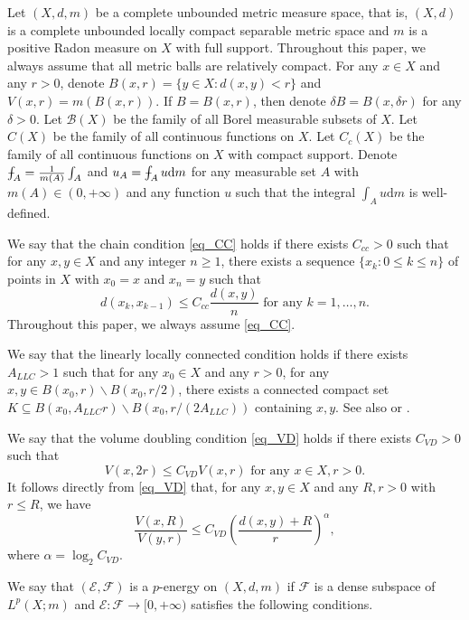 \documentclass[10pt,a4paper]{amsart}
\numberwithin{equation}{section}
\def\Xint#1{\mathchoice
{\XXint\displaystyle\textstyle{#1}}%
{\XXint\textstyle\scriptstyle{#1}}%
{\XXint\scriptstyle\scriptscriptstyle{#1}}%
{\XXint\scriptscriptstyle\scriptscriptstyle{#1}}%
\!\int}
\def\XXint#1#2#3{{\setbox0=\hbox{$#1{#2#3}{\int}$ }
\vcenter{\hbox{$#2#3$ }}\kern-.6\wd0}}
\def\dashint{\Xint-}
\begin{document}
Let $(X,d,m)$ be a complete unbounded metric measure space, that is, $(X,d)$ is a complete unbounded locally compact separable metric space and $m$ is a positive Radon measure on $X$ with full support. Throughout this paper, we always assume that all metric balls are relatively compact. For any $x\in X$ and any $r>0$, denote $B(x,r)=\{y\in X:d(x,y)<r\}$ and $V(x,r)=m(B(x,r))$. If $B=B(x,r)$, then denote $\delta B=B(x,\delta r)$ for any $\delta>0$. Let $\mathcal{B}(X)$ be the family of all Borel measurable subsets of $X$. Let $C(X)$ be the family of all continuous functions on $X$. Let $C_c(X)$ be the family of all continuous functions on $X$ with compact support. Denote $\dashint_A=\frac{1}{m(A)}\int_A$ and $u_A=\dashint_Au\mathrm{d} m$ for any measurable set $A$ with $m(A)\in(0,+\infty)$ and any function $u$ such that the integral $\int_Au\mathrm{d} m$ is well-defined.

We say that the chain condition \ref{eq_CC} holds if there exists $C_{cc}>0$ such that for any $x,y\in X$ and any integer $n\ge1$, there exists a sequence $\{x_k:0\le k\le n\}$ of points in $X$ with $x_0=x$ and $x_n=y$ such that
\begin{equation*}\label{eq_CC}\tag*{CC}
d(x_k,x_{k-1})\le C_{cc} \frac{d(x,y)}{n}\text{ for any }k=1,\ldots,n.
\end{equation*}
Throughout this paper, we always assume \ref{eq_CC}.

We say that the linearly locally connected condition \hypertarget{eq_LLC}{} holds if there exists $A_{LLC}>1$ such that for any $x_0\in X$ and any $r>0$, for any $x,y\in B(x_0,r)\backslash B(x_0,r/2)$, there exists a connected compact set $K\subseteq B(x_0,A_{LLC}r)\backslash B(x_0,r/(2A_{LLC}))$ containing $x,y$. See also \cite[3.12]{HK98} or \cite[Page 234]{HKST15}.

We say that the volume doubling condition \ref{eq_VD} holds if there exists $C_{VD}>0$ such that
\begin{equation*}\label{eq_VD}\tag*{VD}
V(x,2r)\le C_{VD}V(x,r)\text{ for any }x\in X,r>0.
\end{equation*}
It follows directly from \ref{eq_VD} that, for any $x,y\in X$ and any $R,r>0$ with $r\le R$, we have
\begin{equation}\label{eq_VDa}
\frac{V(x,R)}{V(y,r)}\le C_{VD} \left(\frac{d(x,y)+R}{r}\right)^{\alpha},
\end{equation}
where $\alpha=\log_2C_{VD}$.

We say that $(\mathcal{E},\mathcal{F})$ is a $p$-energy on $(X,d,m)$ if $\mathcal{F}$ is a dense subspace of $L^p(X;m)$ and $\mathcal{E}:\mathcal{F}\to[0,+\infty)$ satisfies the following conditions.
\end{document}
